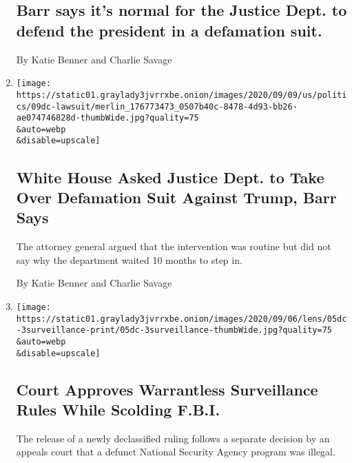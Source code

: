 \begin{enumerate}
  \hypertarget{barr-says-its-normal-for-the-justice-dept-to-defend-the-president-in-a-defamation-suit}{%
  \subsection{Barr says it's normal for the Justice Dept. to defend the
  president in a defamation
  suit.}\label{barr-says-its-normal-for-the-justice-dept-to-defend-the-president-in-a-defamation-suit}}

  By Katie Benner and Charlie Savage
\item
  \href{/2020/09/09/us/politics/trump-e-jean-carroll-lawsuit.html}{}

  \texttt{[image: https://static01.graylady3jvrrxbe.onion/images/2020/09/09/us/politics/09dc-lawsuit/merlin\_176773473\_0507b40c-8478-4d93-bb26-ae074746828d-thumbWide.jpg?quality=75\\\&auto=webp\\\&disable=upscale]}

  \hypertarget{white-house-asked-justice-dept-to-take-over-defamation-suit-against-trump-barr-says}{%
  \subsection{White House Asked Justice Dept. to Take Over Defamation
  Suit Against Trump, Barr
  Says}\label{white-house-asked-justice-dept-to-take-over-defamation-suit-against-trump-barr-says}}

  The attorney general argued that the intervention was routine but did
  not say why the department waited 10 months to step in.

  By Katie Benner and Charlie Savage
\item
  \href{/2020/09/05/us/politics/court-approves-warrantless-surveillance-rules-while-scolding-fbi.html}{}

  \texttt{[image: https://static01.graylady3jvrrxbe.onion/images/2020/09/06/lens/05dc-3surveillance-print/05dc-3surveillance-thumbWide.jpg?quality=75\\\&auto=webp\\\&disable=upscale]}

  \hypertarget{court-approves-warrantless-surveillance-rules-while-scolding-fbi}{%
  \subsection{Court Approves Warrantless Surveillance Rules While
  Scolding
  F.B.I.}\label{court-approves-warrantless-surveillance-rules-while-scolding-fbi}}

  The release of a newly declassified ruling follows a separate decision
  by an appeals court that a defunct National Security Agency program
  was illegal.


\end{enumerate}
